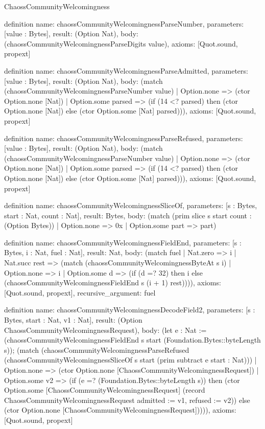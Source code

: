 \begin{lexlean}{ChaossCommunityWelcomingness}
\begin{semanticmodule}
definition{
  name: chaossCommunityWelcomingnessParseNumber,
  parameters: [value : Bytes],
  result: (Option Nat),
  body: (chaossCommunityWelcomingnessParseDigits value),
  axioms: [Quot.sound, propext]
}

definition{
  name: chaossCommunityWelcomingnessParseAdmitted,
  parameters: [value : Bytes],
  result: (Option Nat),
  body: (match (chaossCommunityWelcomingnessParseNumber value)
    | Option.none => (ctor Option.none [Nat])
    | Option.some parsed => (if (14 <? parsed) then (ctor Option.none [Nat]) else (ctor Option.some [Nat] parsed))),
  axioms: [Quot.sound, propext]
}

definition{
  name: chaossCommunityWelcomingnessParseRefused,
  parameters: [value : Bytes],
  result: (Option Nat),
  body: (match (chaossCommunityWelcomingnessParseNumber value)
    | Option.none => (ctor Option.none [Nat])
    | Option.some parsed => (if (14 <? parsed) then (ctor Option.none [Nat]) else (ctor Option.some [Nat] parsed))),
  axioms: [Quot.sound, propext]
}

definition{
  name: chaossCommunityWelcomingnessSliceOf,
  parameters: [s : Bytes, start : Nat, count : Nat],
  result: Bytes,
  body: (match (prim slice s start count : (Option Bytes))
    | Option.none => 0x
    | Option.some part => part)
}

definition{
  name: chaossCommunityWelcomingnessFieldEnd,
  parameters: [s : Bytes, i : Nat, fuel : Nat],
  result: Nat,
  body: (match fuel
    | Nat.zero => i
    | Nat.succ rest => (match (chaossCommunityWelcomingnessByteAt s i)
      | Option.none => i
      | Option.some d => (if (d =? 32) then i else (chaossCommunityWelcomingnessFieldEnd s (i + 1) rest)))),
  axioms: [Quot.sound, propext],
  recursive_argument: fuel
}

definition{
  name: chaossCommunityWelcomingnessDecodeField2,
  parameters: [s : Bytes, start : Nat, v1 : Nat],
  result: (Option ChaossCommunityWelcomingnessRequest),
  body: (let e : Nat := (chaossCommunityWelcomingnessFieldEnd s start (Foundation.Bytes::byteLength s)); (match (chaossCommunityWelcomingnessParseRefused (chaossCommunityWelcomingnessSliceOf s start (prim subtract e start : Nat)))
    | Option.none => (ctor Option.none [ChaossCommunityWelcomingnessRequest])
    | Option.some v2 => (if (e =? (Foundation.Bytes::byteLength s)) then (ctor Option.some [ChaossCommunityWelcomingnessRequest] (record ChaossCommunityWelcomingnessRequest {admitted := v1, refused := v2})) else (ctor Option.none [ChaossCommunityWelcomingnessRequest])))),
  axioms: [Quot.sound, propext]
}


\end{semanticmodule}
\end{lexlean}
